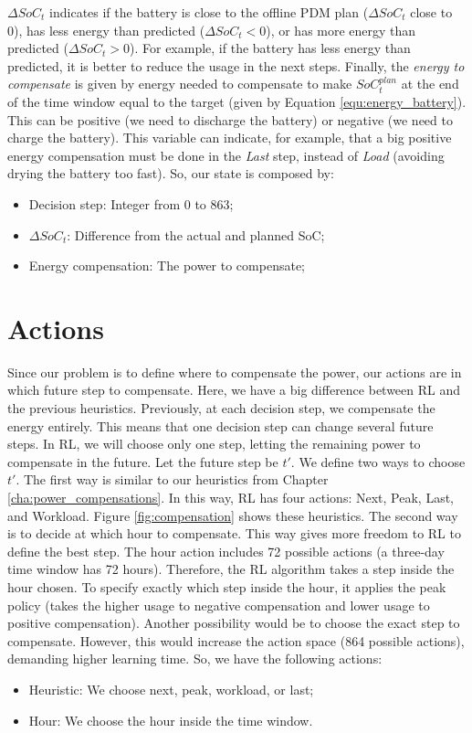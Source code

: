 $\Delta SoC_t$ indicates if the battery is close to the offline PDM plan ($\Delta SoC_t$ close to 0), has less energy than predicted ($\Delta SoC_t < 0$), or has more energy than predicted ($\Delta SoC_t > 0$). For example, if the battery has less energy than predicted, it is better to reduce the usage in the next steps. Finally, the \textit{energy to compensate} is given by energy needed to compensate to make $SoC^{plan}_{t}$ at the end of the time window equal to the target (given by Equation \ref{equ:energy_battery}). This can be positive (we need to discharge the battery) or negative (we need to charge the battery). This variable can indicate, for example, that a big positive energy compensation must be done in the \emph{Last} step, instead of \emph{Load} (avoiding drying the battery too fast). So, our state is composed by:

\begin{itemize}
    \item Decision step: Integer from 0 to 863;
    \item \(\Delta SoC_t\): Difference from the actual and planned SoC;
    \item Energy compensation: The power to compensate;
\end{itemize}

\section{Actions}

Since our problem is to define where to compensate the power, our actions are in which future step to compensate. Here, we have a big difference between RL and the previous heuristics. Previously, at each decision step, we compensate the energy entirely. This means that one decision step can change several future steps. In RL, we will choose only one step, letting the remaining power to compensate in the future. Let the future step be $t'$. We define two ways to choose $t'$. The first way is similar to our heuristics from Chapter \ref{cha:power_compensations}. In this way, RL has four actions: Next, Peak, Last, and Workload. Figure \ref{fig:compensation} shows these heuristics. The second way is to decide at which hour to compensate. This way gives more freedom to RL to define the best step. The hour action includes 72 possible actions (a three-day time window has 72 hours). Therefore, the RL algorithm takes a step inside the hour chosen. To specify exactly which step inside the hour, it applies the peak policy (takes the higher usage to negative compensation and lower usage to positive compensation). Another possibility would be to choose the exact step to compensate. However, this would increase the action space (864 possible actions), demanding higher learning time. So, we have the following actions:
\begin{itemize}
    \item Heuristic: We choose next, peak, workload, or last;
    \item Hour: We choose the hour inside the time window.
\end{itemize}

